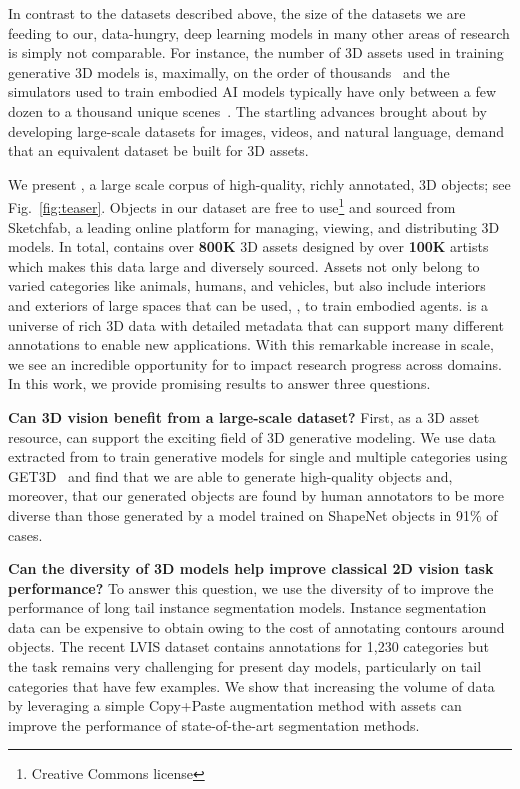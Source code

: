 In contrast to the datasets described above, the size of the datasets we are feeding to our, data-hungry, deep learning models in many other areas of research is simply not comparable. For instance, the number of 3D assets used in training generative 3D models is, maximally, on the order of thousands~\cite{gao2022get3d} and the simulators used to train embodied AI models typically have only between a few dozen to a thousand unique scenes~\cite{kolve2017ai2thor,szot2021habitat,ramrakhya2022habitat,li2021igibson}. The startling advances brought about by developing large-scale datasets for images, videos, and natural language, demand that an equivalent dataset be built for 3D assets.

We present , a large scale corpus of high-quality, richly annotated, 3D objects; see Fig.~\ref{fig:teaser}. Objects in our dataset are free to use\footnote{Creative Commons license} and sourced from Sketchfab, a leading online platform for managing, viewing, and distributing 3D models. In total, \data contains over \textbf{800K} 3D assets designed by over \textbf{100K} artists which makes this data large and diversely sourced.
Assets not only belong to varied categories like animals, humans, and vehicles, but also include interiors and exteriors of large spaces that can be used, \eg, to train embodied agents. \data is a universe of rich 3D data with detailed metadata that can support many different annotations to enable new applications. 
With this remarkable increase in scale, we see an incredible opportunity for \data to impact research progress across domains. In this work, we provide promising results to answer three questions.

\textbf{Can 3D vision benefit from a large-scale dataset?}
First, as a 3D asset resource, \data can support the exciting field of 3D generative modeling. We use data extracted from \data to train generative models for single and multiple categories using GET3D~\cite{gao2022get3d} and find that we are able to generate high-quality objects and, moreover, that our generated objects are found by human annotators to be more diverse than those generated by a model trained on ShapeNet objects in 91\% of cases.

\textbf{Can the diversity of 3D models help improve classical 2D vision task performance?}
To answer this question, we use the diversity of \data
to improve the performance of long tail instance segmentation models. Instance segmentation data can be expensive to obtain owing to the cost of annotating contours around objects. The recent LVIS dataset contains annotations for 1{,}230 categories but the task remains very challenging for present day models, particularly on tail categories that have few examples. We show that increasing the volume of data by leveraging a simple Copy{+}Paste augmentation method with \data assets can improve the performance of state-of-the-art segmentation methods.

